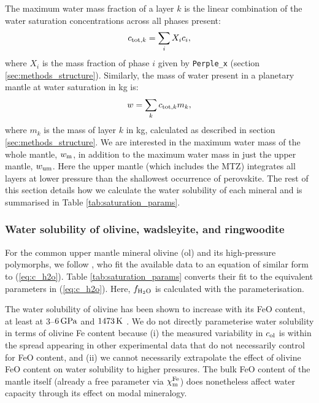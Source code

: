 \documentclass[fleqn,usenatbib]{mnras}
\newcommand{\coreeff}{$\chi^{\rm Fe}_{\rm m}$}
\begin{document}
The maximum water mass fraction of a layer $k$ is the linear combination of the water saturation concentrations across all phases present:
\begin{equation}
    c_{{\rm tot}, k} = \sum_i X_i c_i,
\end{equation}
where $X_i$ is the mass fraction of phase $i$ given by {\tt Perple\_x} (section \ref{sec:methods_structure}). Similarly, the mass of water present in a planetary mantle at water saturation in kg is:
\begin{equation}\label{eq:water_mass}
    w = \sum_k c_{{\rm tot}, k} m_k,
\end{equation}
where $m_k$ is the mass of layer $k$ in kg, calculated as described in section \ref{sec:methods_structure}. We are interested in the maximum water mass of the whole mantle, $w_{\rm m}$, in addition to the maximum water mass in just the upper mantle, $w_{\rm um}$. Here the upper mantle (which includes the MTZ) integrates all layers at lower pressure than the shallowest occurrence of perovskite. The rest of this section details how we calculate the water solubility of each mineral and is summarised in Table \ref{tab:saturation_params}.

\subsubsection{Water solubility of olivine, wadsleyite, and ringwoodite}

For the common upper mantle mineral olivine (ol) and its high-pressure polymorphs, we follow \citet{dong_constraining_2021}, who fit the available data to an equation of similar form to (\ref{eq:c_h2o}). Table \ref{tab:saturation_params} converts their fit to the equivalent parameters in (\ref{eq:c_h2o}). Here, $f_{\rm H_2O}$ is calculated with the \citet{frost_experimental_1997} parameterisation.

The water solubility of olivine has been shown to increase with its FeO content, at least at 3--$6\,{\rm GPa}$ and $1473\,{\rm K}$ \citep{withers_effect_2011}. We do not directly parameterise water solubility in terms of olivine Fe content because (i) the measured variability in $c_{\rm ol}$ is within the spread appearing in other experimental data that do not necessarily control for FeO content, and (ii) we cannot necessarily extrapolate the effect of olivine FeO content on water solubility to higher pressures. The bulk FeO content of the mantle itself (already a free parameter via \coreeff) does nonetheless affect water capacity through its effect on modal mineralogy.
\end{document}
